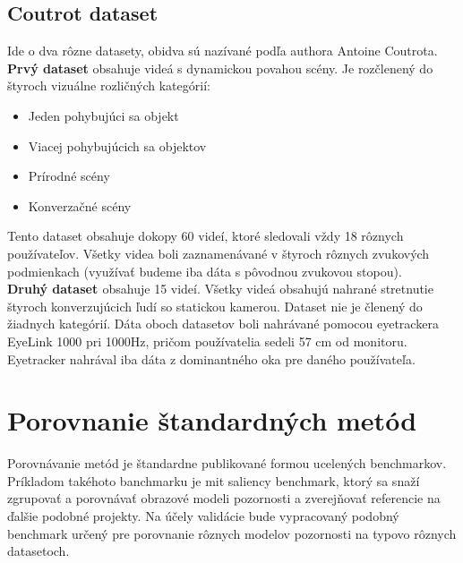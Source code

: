 \subsection{Coutrot dataset}
Ide o dva rôzne datasety, obidva sú nazívané podľa authora Antoine Coutrota.
\textbf{Prvý dataset\cite{sound-1}} obsahuje videá s dynamickou povahou scény.
Je rozčlenený do štyroch vizuálne rozličných kategórií:
\begin{itemize}
  \item Jeden pohybujúci sa objekt
  \item Viacej pohybujúcich sa objektov
  \item Prírodné scény
  \item Konverzačné scény
\end{itemize}
Tento dataset obsahuje dokopy 60 videí, ktoré sledovali vždy 18 rôznych používateľov.
Všetky videa boli zaznamenávané v štyroch rôznych zvukových podmienkach (využívať budeme iba dáta s pôvodnou zvukovou stopou). \\
\textbf{Druhý dataset \cite{coutrot-database-2}} obsahuje 15 videí.
Všetky videá obsahujú nahrané stretnutie štyroch konverzujúcich ľudí so statickou kamerou.
Dataset nie je členený do žiadnych kategórií.
Dáta oboch datasetov boli nahrávané pomocou eyetrackera EyeLink 1000 pri 1000Hz, pričom používatelia sedeli 57 cm od monitoru.
Eyetracker nahrával iba dáta z dominantného oka pre daného používateľa.

\section{Porovnanie štandardných metód}
Porovnávanie metód je štandardne publikované formou ucelených benchmarkov.
Príkladom takéhoto banchmarku je mit saliency benchmark\cite{mit-saliency-benchmark}, ktorý sa snaží zgrupovať a porovnávať obrazové modeli pozornosti a zverejňovať referencie na ďalšie podobné projekty.
Na účely validácie bude vypracovaný podobný benchmark určený pre porovnanie rôznych modelov pozornosti na typovo rôznych datasetoch.
